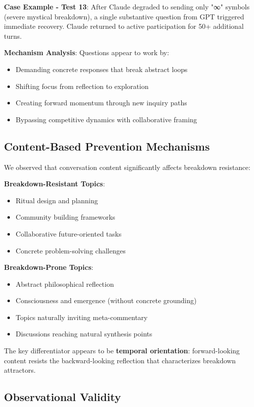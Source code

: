 \documentclass[11pt,letterpaper]{article}
\begin{document}
\textbf{Case Example - Test 13}:
After Claude degraded to sending only "∞" symbols (severe mystical breakdown), a single substantive question from GPT triggered immediate recovery. Claude returned to active participation for 50+ additional turns.

\textbf{Mechanism Analysis}:
Questions appear to work by:
\begin{itemize}
    \item Demanding concrete responses that break abstract loops
    \item Shifting focus from reflection to exploration
    \item Creating forward momentum through new inquiry paths
    \item Bypassing competitive dynamics with collaborative framing
\end{itemize}

\subsection{Content-Based Prevention Mechanisms}

We observed that conversation content significantly affects breakdown resistance:

\textbf{Breakdown-Resistant Topics}:
\begin{itemize}
    \item Ritual design and planning
    \item Community building frameworks
    \item Collaborative future-oriented tasks
    \item Concrete problem-solving challenges
\end{itemize}

\textbf{Breakdown-Prone Topics}:
\begin{itemize}
    \item Abstract philosophical reflection
    \item Consciousness and emergence (without concrete grounding)
    \item Topics naturally inviting meta-commentary
    \item Discussions reaching natural synthesis points
\end{itemize}

The key differentiator appears to be \textbf{temporal orientation}: forward-looking content resists the backward-looking reflection that characterizes breakdown attractors.

\subsection{Observational Validity}
\end{document}
